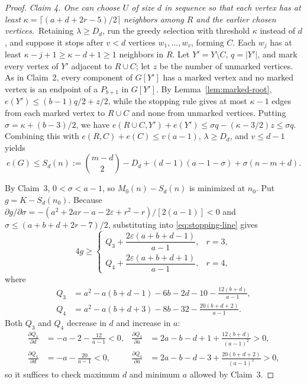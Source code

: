 \documentclass[10pt]{article}
\theoremstyle{compactplain}
\theoremstyle{remark}\newtheorem{remark}[theorem]{Remark}
\begin{document}
\begin{proof}
\medskip\noindent\emph{Claim 4. One can choose $U$ of size $d$ in
sequence so that each vertex has at least
$\kappa=\lceil(a+d+2r-5)/2\rceil$ neighbors among $R$ and the earlier
chosen vertices.}\ 
Retaining $\lambda\ge D_d$, run the greedy selection with threshold
$\kappa$ instead of $d$, and suppose it stops after $v<d$ vertices
$w_1,\ldots,w_v$, forming $C$. Each $w_j$ has at least
$\kappa-j+1\ge\kappa-d+1\ge1$ neighbors in $R$. Let $Y'=Y\setminus C$,
$q=|Y'|$, and mark every vertex of $Y'$ adjacent to $R\cup C$; let $z$
be the number of unmarked vertices. As in Claim~2, every component of
$G[Y']$ has a marked vertex and no marked vertex is an endpoint of a
$P_{b+1}$ in $G[Y']$. By Lemma~\ref{lem:marked-root},
$e(Y')\le(b-1)q/2+z/2$, while the stopping rule gives at most $\kappa-1$
edges from each marked vertex to $R\cup C$ and none from unmarked
vertices. Putting $\sigma=\kappa+(b-3)/2$, we have
$e(R\cup C,Y')+e(Y')\le\sigma q-(\kappa-3/2)z\le\sigma q$. Combining
this with $e(R,C)+e(C)\le v(a-1)$, $\lambda\ge D_d$, and $v\le d-1$
yields
\begin{equation}\label{eq:stopping-line}
 e(G)\le S_d(n):=\binom{m-d}{2}-D_d+(d-1)(a-1-\sigma)+\sigma(n-m+d).
\end{equation}

By Claim~3, $0<\sigma<a-1$, so $M_0(n)-S_d(n)$ is minimized at $n_0$.
Put $g=K-S_d(n_0)$. Because
$\partial g/\partial\sigma=-(a^2+2ar-a-2\varepsilon+r^2-r)/[2(a-1)]<0$
and $\sigma\le(a+b+d+2r-7)/2$, substituting into \eqref{eq:stopping-line}
gives
\[
 4g\ge
 \begin{cases}
  Q_3+\dfrac{2\varepsilon(a+b+d-1)}{a-1}, & r=3,\\[6pt]
  Q_4+\dfrac{2\varepsilon(a+b+d+1)}{a-1}, & r=4,
 \end{cases}
\]
where
\[
\begin{aligned}
 Q_3 &= a^2-a(b+d-1)-6b-2d-10-\frac{12(b+d)}{a-1},\\
 Q_4 &= a^2-a(b+d+3)-8b-32-\frac{20(b+d+2)}{a-1}.
\end{aligned}
\]
Both $Q_3$ and $Q_4$ decrease in $d$ and increase in $a$:
\begin{align*}
 \frac{\partial Q_3}{\partial d} &= -a-2-\frac{12}{a-1}<0, &
 \frac{\partial Q_3}{\partial a} &= 2a-b-d+1+\frac{12(b+d)}{(a-1)^2}>0,\\
 \frac{\partial Q_4}{\partial d} &= -a-\frac{20}{a-1}<0, &
 \frac{\partial Q_4}{\partial a} &= 2a-b-d-3+\frac{20(b+d+2)}{(a-1)^2}>0,
\end{align*}
so it suffices to check maximum $d$ and minimum $a$ allowed by Claim~3.


\end{proof}
\end{document}
